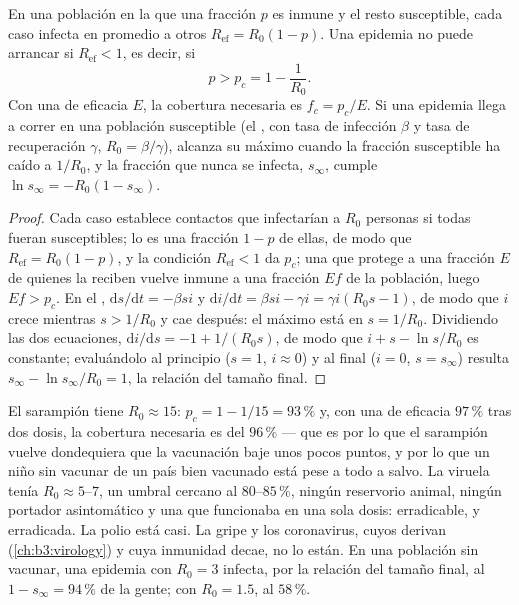 \begin{theorem}\label{thm:b3:adaptive-immunity:herd}
En una población en la que una fracción $p$ es inmune y el resto
susceptible, cada caso infecta en promedio a otros
$R_{\text{ef}} = R_{0}(1 -
p)$. Una epidemia no puede arrancar si $R_{\text{ef}} < 1$, es decir, si
\[
p > p_{c} = 1 - \frac{1}{R_{0}} .
\]
Con una  de eficacia $E$, la cobertura necesaria es
$f_{c} = p_{c}/E$. Si una epidemia llega a correr en una población
susceptible (el , con tasa de infección $\beta$ y tasa de
recuperación $\gamma$, $R_{0} =
\beta/\gamma$), alcanza su máximo cuando la fracción susceptible ha caído
a $1/R_{0}$, y la fracción que nunca se infecta, $s_{\infty}$, cumple
$\ln s_{\infty} = -R_{0}(1 - s_{\infty})$.
\end{theorem}
\begin{proof}
Cada caso establece contactos que infectarían a $R_{0}$ personas si todas
fueran susceptibles; lo es una fracción $1 - p$ de ellas, de modo que
$R_{\text{ef}} =
R_{0}(1-p)$, y la condición $R_{\text{ef}} < 1$ da $p_{c}$; una 
que protege a una fracción $E$ de quienes la reciben vuelve inmune a una
fracción $Ef$ de la población, luego $Ef > p_{c}$. En el ,
$\mathrm{d}s/\mathrm{d}t = -\beta si$ y $\mathrm{d}i/\mathrm{d}t =
\beta si - \gamma i = \gamma i(R_{0}s - 1)$, de modo que $i$ crece
mientras $s >
1/R_{0}$ y cae después: el máximo está en $s = 1/R_{0}$. Dividiendo las
dos ecuaciones, $\mathrm{d}i/\mathrm{d}s = -1 + 1/(R_{0}s)$, de modo que
$i + s -
\ln s/R_{0}$ es constante; evaluándolo al principio ($s = 1$, $i
\approx 0$) y al final ($i = 0$, $s = s_{\infty}$) resulta
$s_{\infty} - \ln s_{\infty}/R_{0} = 1$, la relación del tamaño final.
\end{proof}

\begin{example}\label{ex:b3:adaptive-immunity:measles}
El sarampión tiene $R_{0} \approx 15$: $p_{c} = 1 - 1/15 = 93\,\%$ y, con
una  de eficacia $97\,\%$ tras dos dosis, la cobertura necesaria es
del $96\,\%$ --- que es por lo que el sarampión vuelve dondequiera que la
vacunación baje unos pocos puntos, y por lo que un niño sin vacunar de un
país bien vacunado está pese a todo a salvo. La viruela tenía
$R_{0} \approx 5$--$7$, un umbral cercano al $80$--$85\,\%$, ningún
reservorio animal, ningún portador asintomático y una  que
funcionaba en una sola dosis: erradicable, y erradicada. La polio está
casi. La gripe y los coronavirus, cuyos  derivan
(\cref{ch:b3:virology}) y cuya inmunidad decae, no lo están. En una
población sin vacunar, una epidemia con $R_{0} = 3$ infecta, por la
relación del tamaño final, al $1 - s_{\infty} = 94\,\%$ de la gente; con
$R_{0} = 1.5$, al $58\,\%$.
\end{example}


